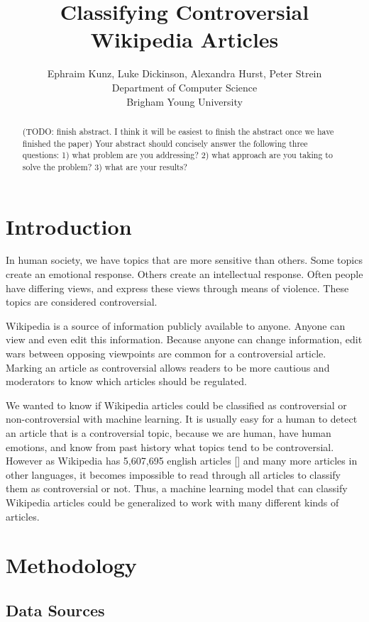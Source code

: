 \documentclass{article}
\title{Classifying Controversial Wikipedia Articles}
\author{Ephraim Kunz, Luke Dickinson, Alexandra Hurst, Peter Strein \\
Department of Computer Science\\
Brigham Young University}
\begin{document}
\maketitle

\begin{abstract}
  (TODO: finish abstract. I think it will be easiest to finish the abstract once we have finished the paper)
  Your abstract should concisely answer the following three questions: 1) what problem are you addressing? 2) what approach are you taking to solve the problem? 3) what are your results?
\end{abstract}

\section{Introduction}

In human society, we have topics that are more sensitive than others. Some topics create an emotional response. 
Others create an intellectual response. Often people have differing views, and express these views through means of violence.
These topics are considered controversial. 

Wikipedia is a source of information publicly available to anyone. Anyone can view and even edit this information. 
Because anyone can change information, edit wars between opposing viewpoints are common for a controversial article. 
Marking an article as controversial allows readers to be more cautious and moderators to know which articles should be regulated.

We wanted to know if Wikipedia articles could be classified as controversial or non-controversial with machine learning.
It is usually easy for a human to detect an article that is a controversial topic, because we are human, have human emotions, and know from past history what topics tend to be controversial. 
However as Wikipedia has 5,607,695 english articles [] and many more articles in other languages, it becomes impossible to read through all articles to classify them as controversial or not.
Thus, a machine learning model that can classify Wikipedia articles could be generalized to work with many different kinds of articles. 

\section{Methodology}

\subsection{Data Sources}
\end{document}

